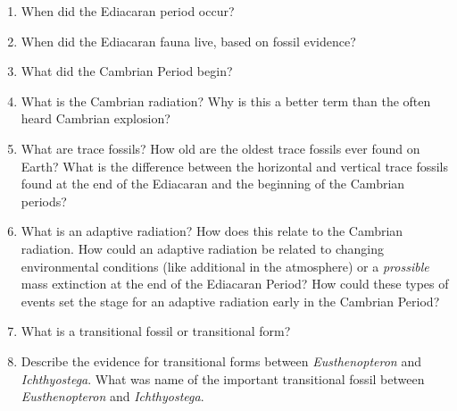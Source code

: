 \documentclass[letterpaper]{tufte-handout}
\begin{document}
\begin{enumerate}

	\item When did the Ediacaran period occur?

	\item When did the Ediacaran fauna live, based on fossil evidence?

	\item What did the Cambrian Period begin?
	
	\item What is the Cambrian radiation?  Why is this a better term than the often heard Cambrian explosion?
	
	\item What are trace fossils? How old are the oldest trace fossils ever found on Earth? What is the difference between the horizontal and vertical trace fossils found at the end of the Ediacaran and the beginning of the Cambrian periods?
	
	\item What is an adaptive radiation?  How does this relate to the Cambrian radiation. How could an adaptive radiation be related to changing environmental conditions (like additional  in the atmosphere) or a \emph{prossible} mass extinction  at the end of the Ediacaran Period? How could  these types of events set the stage for an adaptive radiation early in the Cambrian Period?
	
	\item What is a transitional fossil or transitional form?

	\item Describe  the evidence for transitional forms between \textit{Eusthenopteron} and \textit{Ichthyostega}. What was name of the important transitional fossil between \textit{Eusthenopteron} and \textit{Ichthyostega}.


\end{enumerate}
\end{document}
